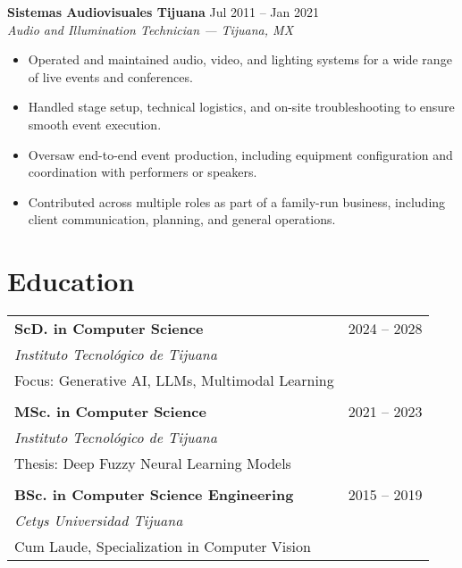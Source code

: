 \documentclass[letterpaper,11pt]{article}
\newcommand{\resumeSubheading}[4]{
  \vspace{1pt}\textbf{#1} \hfill #2\\
  {\emph{#3}} \hfill {\small #4}\\
}
\begin{document}
\resumeSubheading{Sistemas Audiovisuales Tijuana}{Jul 2011 -- Jan 2021}{Audio and Illumination Technician — Tijuana, MX}{}
\begin{itemize}[leftmargin=0.15in, itemsep=2pt, topsep=2pt, parsep=0pt]
  \item Operated and maintained audio, video, and lighting systems for a wide range of live events and conferences.
  \item Handled stage setup, technical logistics, and on-site troubleshooting to ensure smooth event execution.
  \item Oversaw end-to-end event production, including equipment configuration and coordination with performers or speakers.
  \item Contributed across multiple roles as part of a family-run business, including client communication, planning, and general operations.
\end{itemize}


\section*{Education}
\begin{tabularx}{\textwidth}{@{}Xr@{}}
\textbf{ScD. in Computer Science} & 2024 -- 2028 \\
\textit{Instituto Tecnológico de Tijuana} & \\
Focus: Generative AI, LLMs, Multimodal Learning & \\
\\[-1ex]
\textbf{MSc. in Computer Science} & 2021 -- 2023 \\
\textit{Instituto Tecnológico de Tijuana} & \\
Thesis: Deep Fuzzy Neural Learning Models & \\
\\[-1ex]
\textbf{BSc. in Computer Science Engineering} & 2015 -- 2019 \\
\textit{Cetys Universidad Tijuana} & \\
Cum Laude, Specialization in Computer Vision & \\
\end{tabularx}

\end{document}
